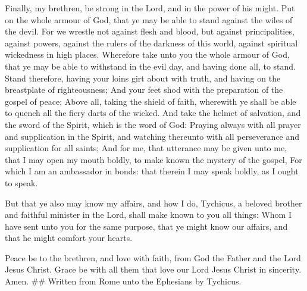  Finally, my brethren, be strong in the Lord, and in the
power of his might.  Put on the whole armour of God, that
ye may be able to stand against the wiles of the devil. 
For we wrestle not against flesh and blood, but against principalities,
against powers, against the rulers of the darkness of this world,
against spiritual wickedness in high places.  Wherefore
take unto you the whole armour of God, that ye may be able to withstand
in the evil day, and having done all, to stand.  Stand
therefore, having your loins girt about with truth, and having on the
breastplate of righteousness;  And your feet shod with
the preparation of the gospel of peace;  Above all,
taking the shield of faith, wherewith ye shall be able to quench all the
fiery darts of the wicked.  And take the helmet of
salvation, and the sword of the Spirit, which is the word of God:
 Praying always with all prayer and supplication in the
Spirit, and watching thereunto with all perseverance and supplication
for all saints;  And for me, that utterance may be given
unto me, that I may open my mouth boldly, to make known the mystery of
the gospel,  For which I am an ambassador in bonds: that
therein I may speak boldly, as I ought to speak.

 But that ye also may know my affairs, and how I do,
Tychicus, a beloved brother and faithful minister in the Lord, shall
make known to you all things:  Whom I have sent unto you
for the same purpose, that ye might know our affairs, and that he might
comfort your hearts.

 Peace be to the brethren, and love with faith, from God
the Father and the Lord Jesus Christ.  Grace be with all
them that love our Lord Jesus Christ in sincerity. Amen. \#\# Written
from Rome unto the Ephesians by Tychicus.

